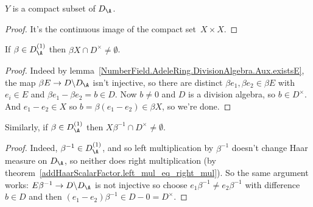 \begin{lemma}
  \label{NumberField.AdeleRing.DivisionAlgebra.Aux.Y_compact}
  \leanok
  $Y$ is a compact subset of $D_{\A}$.
\end{lemma}
\begin{proof}
  \leanok
  It's the continuous image of the compact set~$X\times X$.
\end{proof}

\begin{lemma}
  \label{NumberField.AdeleRing.DivisionAlgebra.Aux.X_meets_kernel}
  \leanok
  If $\beta\in D_{\A}^{(1)}$ then
$\beta X\cap D^\times\not=\emptyset$.
\end{lemma}
\begin{proof}
  \leanok
Indeed by lemma~\ref{NumberField.AdeleRing.DivisionAlgebra.Aux.existsE},
the map $\beta E\to D\backslash D_{\A}$
isn't injective, so there are distinct
$\beta e_1,\beta e_2\in \beta E$ with $e_i\in E$ and
$\beta e_1-\beta e_2=b\in D$.
Now $b\not=0$ and $D$ is a division algebra, so $b\in D^\times$.
And $e_1-e_2\in X$ so $b=\beta(e_1-e_2)\in \beta X$, so we're done.
\end{proof}

\begin{lemma}
  \label{NumberField.AdeleRing.DivisionAlgebra.Aux.X_meets_kernel'}
  \leanok
  Similarly, if $\beta\in D_{\A}^{(1)}$ then
  $X\beta^{-1}\cap D^\times\not=\emptyset$.
\end{lemma}
\begin{proof}
  \leanok
  Indeed, $\beta^{-1}\in D_{\A}^{(1)}$, and so left multiplication by $\beta^{-1}$
  doesn't change Haar measure on $D_{\A}$, so neither does right multiplication
  (by theorem~\ref{addHaarScalarFactor.left_mul_eq_right_mul}).
  So the same argument works: $E\beta^{-1}\to D\backslash D_{\A}$ is not
  injective so choose $e_1\beta^{-1}\not=e_2\beta^{-1}$ with difference $b\in D$
  and then $(e_1-e_2)\beta^{-1}\in D-{0}=D^\times$.
\end{proof}

